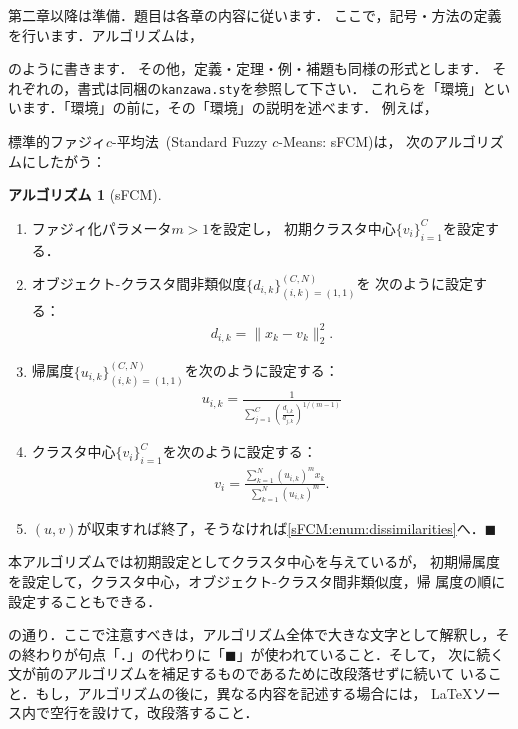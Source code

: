 \documentclass[a4j,12pt,dvipdfmx,oneside]{jsbook}
\theoremstyle{definition}
\newtheorem{Alg}[theorem]{アルゴリズム}
\newcommand{\QED}{\hfill$\blacksquare$\par}
\begin{document}
第二章以降は準備．題目は各章の内容に従います．
ここで，記号・方法の定義を行います．アルゴリズムは，
のように書きます．
その他，定義・定理・例・補題も同様の形式とします．
それぞれの，書式は同梱の\texttt{kanzawa.sty}を参照して下さい．
これらを「環境」といいます．「環境」の前に，その「環境」の説明を述べます．
例えば，
\begin{screen}
標準的ファジィ$c$-平均法~(Standard Fuzzy $c$-Means: sFCM)は，
次のアルゴリズムにしたがう：
\begin{Alg}[sFCM]~\cite{kanzawa}
\begin{enumerate}[label=\textsc{Step}~\arabic*., labelindent=\parindent, leftmargin=*]
\item
ファジィ化パラメータ$m>1$を設定し，
初期クラスタ中心$\{v_i\}_{i=1}^C$を設定する．
\label{sFCM:enum:initialize}
\item
オブジェクト-クラスタ間非類似度$\{d_{i,k}\}_{(i,k)=(1,1)}^{(C,N)}$を
次のように設定する：
\begin{align}
d_{i,k}=\|x_k-v_k\|_2^2.
\end{align}
\label{sFCM:enum:dissimilarities}
\item
帰属度$\{u_{i,k}\}_{(i,k)=(1,1)}^{(C,N)}$を次のように設定する：
\begin{align}
u_{i,k}=
\frac{1}{\sum_{j=1}^C\left(\frac{d_{i,k}}{d_{j,k}}\right)^{1/(m-1)}}
\end{align}
\label{sFCM:enum:membership}
\item
クラスタ中心$\{v_i\}_{i=1}^C$を次のように設定する：
\begin{align}
 v_i=\frac{\sum_{k=1}^N{}(u_{i,k})^m{}x_k}{\sum_{k=1}^N{}(u_{i,k})^m}.
\end{align}
\label{sFCM:enum:centers}
\item
$(u,v)$が収束すれば終了，そうなければ\ref{sFCM:enum:dissimilarities}へ．\QED
\end{enumerate}
\end{Alg}
本アルゴリズムでは初期設定としてクラスタ中心を与えているが，
初期帰属度を設定して，クラスタ中心，オブジェクト-クラスタ間非類似度，帰
 属度の順に設定することもできる．
\end{screen}
の通り．ここで注意すべきは，アルゴリズム全体で大きな文字として解釈し，そ
の終わりが句点「．」の代わりに「$\blacksquare$」が使われていること．そして，
次に続く文が前のアルゴリズムを補足するものであるために改段落せずに続いて
いること．もし，アルゴリズムの後に，異なる内容を記述する場合には，
\LaTeX{}ソース内で空行を設けて，改段落すること．
\end{document}
